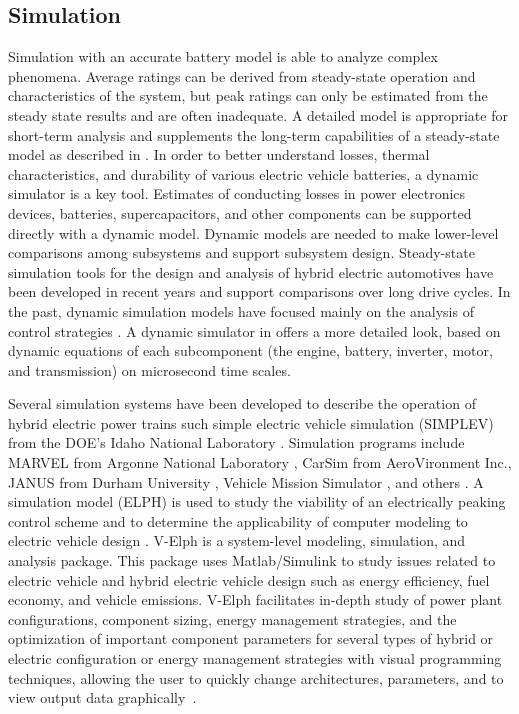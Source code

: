 \subsection{Simulation}

Simulation with an accurate battery model is able to analyze complex phenomena. Average ratings can be
derived from steady-state operation and characteristics of the
system, but peak ratings can only be estimated from the steady state results and are often inadequate. A detailed model is appropriate for short-term
analysis and supplements the long-term capabilities of a
steady-state model as described in \cite{ZS_wip,ZS_adv}.  In order to better understand losses, thermal
characteristics, and durability of various  electric vehicle batteries, a
dynamic simulator is a key tool. Estimates of conducting losses in
power electronics devices, batteries, supercapacitors, and other components can be supported directly with a dynamic model. 
Dynamic models are needed to make lower-level comparisons
among subsystems and support subsystem design. Steady-state simulation tools for the design and analysis of
hybrid electric automotives have been developed in recent years and support comparisons over long drive cycles. In the past, dynamic
simulation models have focused mainly on the analysis of
control strategies \cite{ZS_amr}. A dynamic simulator in \cite{ZS_log} offers a more
detailed look, based on dynamic equations of each
subcomponent (the engine, battery, inverter, motor, and
transmission) on microsecond time scales.

Several simulation systems have been
developed to describe the operation of hybrid electric power
trains such simple electric vehicle simulation (SIMPLEV) from
the DOE’s Idaho National Laboratory \cite{ZS_col}. Simulation programs include MARVEL from
Argonne National Laboratory \cite{ZS_wal}, CarSim from AeroVironment
Inc., JANUS from Durham University \cite{ZS_bum}, 
Vehicle Mission Simulator \cite{ZS_noo}, and others \cite{ZS_aue,ZS_kri}. A
simulation model (ELPH) is used to study the viability of an electrically
peaking control scheme and to determine the applicability of
computer modeling to electric vehicle design \cite{ZS_bun}. V-Elph \cite{ZS_ste,ZS_but} is a system-level modeling, simulation,
and analysis package. This package uses Matlab/Simulink to study issues related to electric vehicle and
hybrid electric vehicle design such as energy efficiency, fuel economy, and
vehicle emissions. V-Elph facilitates in-depth study of power
plant configurations, component sizing, energy management
strategies, and the optimization of important component parameters
for several types of hybrid or electric configuration
or energy management strategies with visual programming
techniques, allowing the user to quickly change architectures,
parameters, and to view output data graphically~\cite{Butler:TVT99}.


